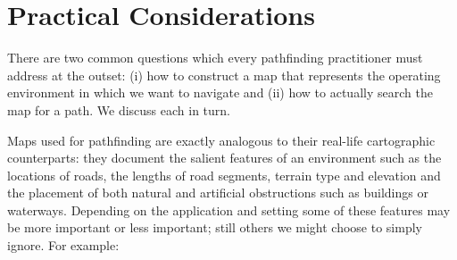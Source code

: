 \section{Practical Considerations}
\label{cha::intro::practical}

There are two common questions which every pathfinding practitioner must address
at the outset:
 (i) how to construct a map that represents the operating 
environment in which we want to navigate and (ii) how to actually search the map
for a path. We discuss each in turn.

Maps used for pathfinding are exactly analogous to their real-life cartographic 
counterparts: they document the salient features of an environment such as the
locations of roads, the lengths of road segments, terrain type and elevation
and the placement of both natural and artificial obstructions such as buildings 
or waterways. 
Depending on the application and setting some of these 
features may be more important or less important; still others we might choose
 to simply ignore. For example:

